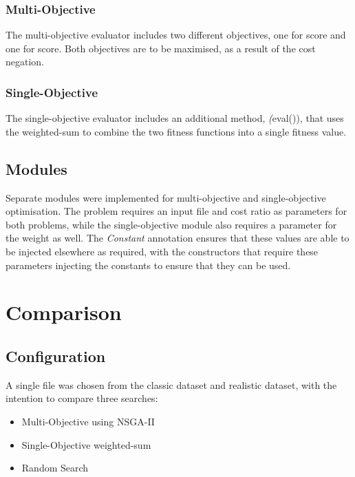 \documentclass[11pt, a4paper]{article}
\begin{document}
\subsubsection{Multi-Objective} %
\label{ssub:impl_multi_objective}
The multi-objective evaluator includes two different objectives, one for score
and one for score. Both objectives are to be maximised, as a result of the cost
negation.

\subsubsection{Single-Objective} %
\label{ssub:impl_single_objective}
The single-objective evaluator includes an additional method, \emph(eval()),
that uses the weighted-sum to combine the two fitness functions into a single
fitness value.

\subsection{Modules} %
\label{sub:modules}
Separate modules were implemented for multi-objective and single-objective
optimisation. The problem requires an input file and cost ratio as parameters
for both problems, while the single-objective module also requires a parameter
for the weight as well. The \emph{Constant} annotation ensures that these values
are able to be injected elsewhere as required, with the constructors that
require these parameters injecting the constants to ensure that they can be
used.

\section{Comparison}
\label{sec:comparison}

\subsection{Configuration} %
\label{sub:configuration}
A single file was chosen from the classic dataset and realistic dataset, with
the intention to compare three searches:
\begin{itemize}
    \item Multi-Objective using NSGA-II
    \item Single-Objective weighted-sum
    \item Random Search
\end{itemize}
\end{document}
